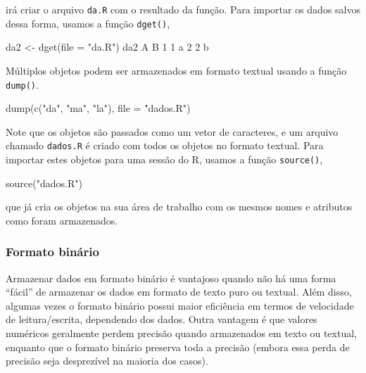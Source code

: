 \documentclass[
  10pt,
  a4paper]{book}
\newenvironment{Shaded}{\begin{snugshade}}{\end{snugshade}}
\newcommand{\AttributeTok}[1]{\textcolor[rgb]{0.77,0.63,0.00}{#1}}
\newcommand{\DecValTok}[1]{\textcolor[rgb]{0.00,0.00,0.81}{#1}}
\newcommand{\FunctionTok}[1]{\textcolor[rgb]{0.00,0.00,0.00}{#1}}
\newcommand{\NormalTok}[1]{#1}
\newcommand{\OtherTok}[1]{\textcolor[rgb]{0.56,0.35,0.01}{#1}}
\newcommand{\StringTok}[1]{\textcolor[rgb]{0.31,0.60,0.02}{#1}}
\begin{document}
irá criar o arquivo \texttt{da.R} com o resultado da função. Para importar os
dados salvos dessa forma, usamos a função \texttt{dget()},

\begin{Shaded}
\begin{Highlighting}[]
\NormalTok{da2 }\OtherTok{\textless{}{-}} \FunctionTok{dget}\NormalTok{(}\AttributeTok{file =} \StringTok{"da.R"}\NormalTok{)}
\NormalTok{da2}
\NormalTok{  A B}
\DecValTok{1} \DecValTok{1}\NormalTok{ a}
\DecValTok{2} \DecValTok{2}\NormalTok{ b}
\end{Highlighting}
\end{Shaded}

Múltiplos objetos podem ser armazenados em formato textual usando a
função \texttt{dump()}.

\begin{Shaded}
\begin{Highlighting}[]
\FunctionTok{dump}\NormalTok{(}\FunctionTok{c}\NormalTok{(}\StringTok{"da"}\NormalTok{, }\StringTok{"ma"}\NormalTok{, }\StringTok{"la"}\NormalTok{), }\AttributeTok{file =} \StringTok{"dados.R"}\NormalTok{)}
\end{Highlighting}
\end{Shaded}

Note que os objetos são passados como um vetor de caracteres, e um
arquivo chamado \texttt{dados.R} é criado com todos os objetos no formato
textual. Para importar estes objetos para uma sessão do R, usamos a
função \texttt{source()},

\begin{Shaded}
\begin{Highlighting}[]
\FunctionTok{source}\NormalTok{(}\StringTok{"dados.R"}\NormalTok{)}
\end{Highlighting}
\end{Shaded}

que já cria os objetos na sua área de trabalho com os mesmos nomes e
atributos como foram armazenados.

\hypertarget{formato-binuxe1rio}{%
\subsubsection{Formato binário}\label{formato-binuxe1rio}}

Armazenar dados em formato binário é vantajoso quando não há uma forma
``fácil'' de armazenar os dados em formato de texto puro ou textual. Além
disso, algumas vezes o formato binário possui maior eficiência em termos
de velocidade de leitura/escrita, dependendo dos dados. Outra vantagem é
que valores numéricos geralmente perdem precisão quando armazenados em
texto ou textual, enquanto que o formato binário preserva toda a
precisão (embora essa perda de precisão seja desprezível na maioria dos
casos).
\end{document}
